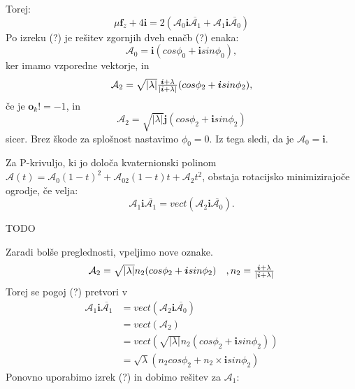 \documentclass[mat1]{fmfdelo}
\newcommand{\ii}{\boldsymbol i}
\newcommand{\jj}{\boldsymbol j}
\newcommand{\oo}{\boldsymbol o}
\newcommand{\A}{\mathcal A}
\newcommand{\ff}{\boldsymbol f}
\begin{document}
Torej:
\begin{equation}
	\mu \ff_z + 4 \ii = 2(\A_0 \ii \overline{\A_1} + \A_1 \ii \overline{\A_0})
\end{equation}
Po izreku (?) je rešitev zgornjih dveh enačb (?) enaka:
\begin{equation}
	\A_0 = \ii (cos\phi_0 + \ii sin \phi_0),
\end{equation}
ker imamo vzporedne vektorje, in
\begin{equation}
\begin{array}{c c}
	\A_2 = \sqrt{|\lambda|} \frac{\ii + \lambda}{|\ii + \lambda|}(cos\phi_2 + \ii sin\phi_2),
\end{array}
\end{equation}
če je $\oo_k != -1$, in 
\begin{equation}
\A_2 = \sqrt{|\lambda|} \jj(cos\phi_2 + \ii sin\phi_2)
\end{equation}
sicer. Brez škode za splošnost nastavimo $\phi_0 = 0$. Iz tega sledi, da je $\A_0 = \ii$.
\begin{izrek}
	Za P-krivuljo, ki jo določa kvaternionski polinom $\A(t) = \A_0(1-t)^2 + \A_02(1-t)t + \A_2t^2$, obstaja rotacijsko minimizirajoče ogrodje, če velja:
	\begin{equation}
		\A_1 \ii \overline{\A_1} = vect(\A_2 \ii \overline{\A_0}).
	\end{equation}
\end{izrek}
\begin{dokaz}
	TODO
\end{dokaz}
Zaradi bolše preglednosti, vpeljimo nove oznake.
\begin{equation}
\begin{array}{c c}
	\A_2 = \sqrt{|\lambda|} n_2 (cos\phi_2 + \ii sin\phi_2) &, n_2 = \frac{\ii + \lambda}{|\ii + \lambda|}
\end{array}
\end{equation}
Torej se pogoj (?) pretvori v
\begin{equation}
\begin{split}
	\A_1 \ii \overline{\A_1} &=vect(\A_2 \ii \overline{\A_0})\\  
	&=vect(\A_2) \\
	&= vect\left( \sqrt{|\lambda|} n_2(cos\phi_2 + \ii sin\phi_2) \right) \\
	&= \sqrt{\lambda} \left(n_2 cos\phi_2 + n_2 \times \ii sin\phi_2\right) 
\end{split}
\end{equation}
Ponovno uporabimo izrek (?) in dobimo rešitev za $\A_1$:
\end{document}
